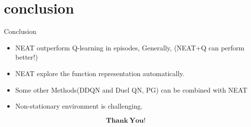 \documentclass{beamer}
\begin{document}
\section{conclusion}

 \begin{frame}
  \begin{block}{Conclusion}
        \begin{itemize}
          \item NEAT outperform Q-learning in episodes, Generally, (NEAT+Q can perform better!)
          \item NEAT explore the function representation automatically.
          \item Some other Methods(DDQN and Duel QN, PG) can be combined with NEAT
          \item Non-stationary environment is challenging.
        \end{itemize}
      \end{block}
      \end{frame}

\begin{frame}
  \begin{block}{}
    \begin{equation}
      \mathbf{Thank} \ \mathbf{You} \mathbf{!} \nonumber
    \end{equation}
  \end{block}
\end{frame}
\end{document}

